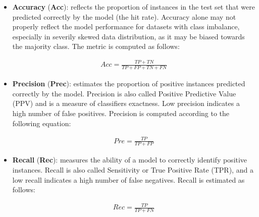 \begin{itemize}
    \item \textbf{Accuracy} (\textbf{Acc}): reflects the proportion of instances in the test set that were predicted correctly by the model (\ie the hit rate). Accuracy alone may not properly reflect the model performance for datasets with class imbalance, especially in severily skewed data distribution, as it may be biased towards the majority class. The metric is computed as follows:
    \begin{ceqn}
    \begin{align}
        Acc = \frac{TP + TN}{TP + FP + TN + FN}
    \end{align}
    \label{eq:accuracy}
    \end{ceqn}
    
    \item \textbf{Precision} (\textbf{Prec}): estimates the proportion of positive instances predicted correctly by the model. Precision is also called Positive Predictive Value (PPV) and is a measure of classifiers exactness.  Low precision indicates a high number of false positives. Precision is computed according to the following equation: %
    \begin{ceqn}
    \begin{align}
        Pre = \frac{TP}{TP + FP}
    \end{align}
    \label{eq:precision}
    \end{ceqn}
    
    \item \textbf{Recall} (\textbf{Rec}):  measures the ability of a model to correctly identify positive instances. Recall is also called Sensitivity or True Positive Rate (TPR), and a low recall indicates a high number of false negatives. Recall is estimated as follows:
    \begin{ceqn}
    \begin{align}
        Rec = \frac{TP}{TP + FN}
    \end{align}
    \label{eq:recall}
    \end{ceqn}
 

\end{itemize}
